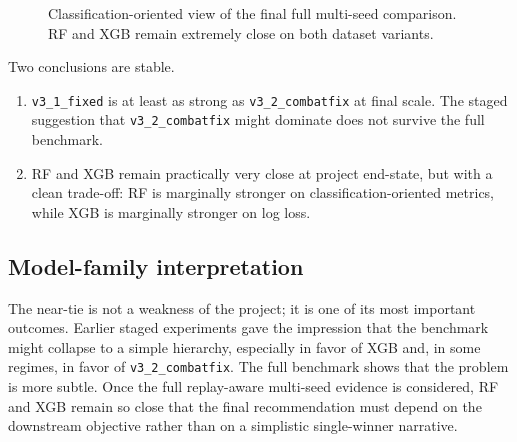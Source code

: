 \documentclass[11pt,a4paper]{article}
\begin{document}
\begin{figure}[H]
\centering
{}
\caption{Classification-oriented view of the final full multi-seed comparison. RF and XGB remain extremely close on both dataset variants.}
\label{fig:fullcompare}
\end{figure}

Two conclusions are stable.
\begin{enumerate}
    \item \texttt{v3\_1\_fixed} is at least as strong as \texttt{v3\_2\_combatfix} at final scale. The staged suggestion that \texttt{v3\_2\_combatfix} might dominate does not survive the full benchmark.
    \item RF and XGB remain practically very close at project end-state, but with a clean trade-off: RF is marginally stronger on classification-oriented metrics, while XGB is marginally stronger on log loss.
\end{enumerate}

\subsection{Model-family interpretation}
The near-tie is not a weakness of the project; it is one of its most important outcomes. Earlier staged experiments gave the impression that the benchmark might collapse to a simple hierarchy, especially in favor of XGB and, in some regimes, in favor of \texttt{v3\_2\_combatfix}. The full benchmark shows that the problem is more subtle. Once the full replay-aware multi-seed evidence is considered, RF and XGB remain so close that the final recommendation must depend on the downstream objective rather than on a simplistic single-winner narrative.
\end{document}
